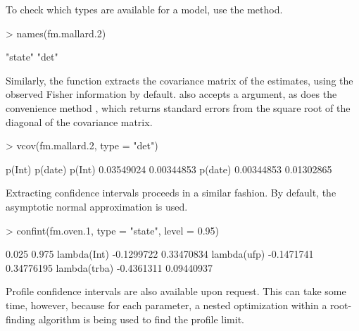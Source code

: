 \documentclass[article,shortnames]{jss}
\begin{document}
{To check which types are available for a model, use the  method.

\begin{Schunk}
\begin{Sinput}
> names(fm.mallard.2)
\end{Sinput}
\begin{Soutput}
[1] "state" "det"  
\end{Soutput}
\end{Schunk}

Similarly, the  function extracts the covariance matrix of
the estimates, using the observed Fisher information by default.  
also accepts a  argument, as does the convenience method 
, which returns standard errors from the square root of the diagonal 
of the covariance matrix. 

\begin{Schunk}
\begin{Sinput}
> vcov(fm.mallard.2, type = "det")
\end{Sinput}
\begin{Soutput}
            p(Int)    p(date)
p(Int)  0.03549024 0.00344853
p(date) 0.00344853 0.01302865
\end{Soutput}
\end{Schunk}

Extracting confidence intervals proceeds in a similar 
fashion.  By default, the asymptotic normal approximation is used.

\begin{Schunk}
\begin{Sinput}
> confint(fm.oven.1, type = "state", level = 0.95)
\end{Sinput}
\begin{Soutput}
                  0.025      0.975
lambda(Int)  -0.1299722 0.33470834
lambda(ufp)  -0.1471741 0.34776195
lambda(trba) -0.4361311 0.09440937
\end{Soutput}
\end{Schunk}

Profile confidence intervals are also available upon request.  This
can take some time, however, because for each parameter, a nested
optimization within a root-finding algorithm is being used to find the
profile limit.

}
\end{document}
